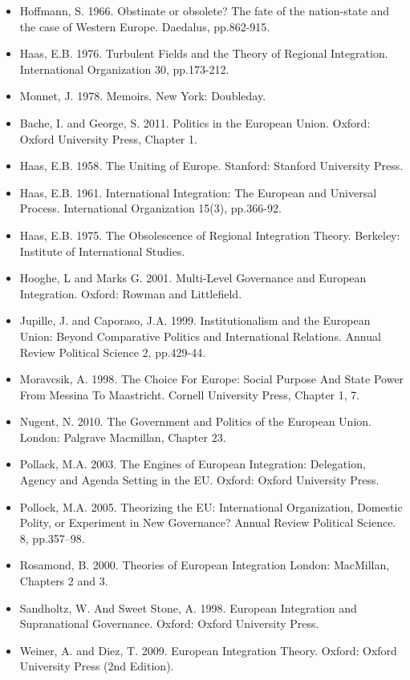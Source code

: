\begin{itemize}
	\item Hoffmann, S. 1966. Obstinate or obsolete? The fate of the nation-state and the case of Western Europe. Daedalus, pp.862-915.
	\item Haas, E.B. 1976. Turbulent Fields and the Theory of Regional Integration. International Organization 30, pp.173-212.
	\item Monnet, J. 1978. Memoirs. New York: Doubleday.
	\item Bache, I. and George, S. 2011. Politics in the European Union. Oxford: Oxford University Press, Chapter 1.
	\item Haas, E.B. 1958. The Uniting of Europe. Stanford: Stanford University Press.
	\item Haas, E.B. 1961. International Integration: The European and Universal Process. International Organization 15(3), pp.366-92.
	\item Haas, E.B. 1975. The Obsolescence of Regional Integration Theory. Berkeley: Institute of International Studies.
	\item Hooghe, L and Marks G. 2001. Multi-Level Governance and European Integration. Oxford: Rowman and Littlefield.
	\item Jupille, J. and Caporaso, J.A. 1999. Institutionalism and the European Union: Beyond Comparative Politics and International Relations. Annual Review Political Science 2, pp.429-44.
	\item Moravcsik, A. 1998. The Choice For Europe: Social Purpose And State Power From Messina To Maastricht. Cornell University Press, Chapter 1, 7.
	\item Nugent, N. 2010. The Government and Politics of the European Union. London: Palgrave Macmillan, Chapter 23.
	\item Pollack, M.A. 2003. The Engines of European Integration: Delegation, Agency and Agenda Setting in the EU. Oxford: Oxford University Press.
	\item Pollock, M.A. 2005. Theorizing the EU: International Organization, Domestic Polity, or Experiment in New Governance? Annual Review Political Science. 8, pp.357–98.
	\item Rosamond, B. 2000. Theories of European Integration London: MacMillan, Chapters 2 and 3. 
	\item Sandholtz, W. And Sweet Stone, A. 1998. European Integration and Supranational Governance. Oxford: Oxford University Press.
	\item Weiner, A. and Diez, T. 2009. European Integration Theory. Oxford: Oxford University Press (2nd Edition).

\end{itemize}

